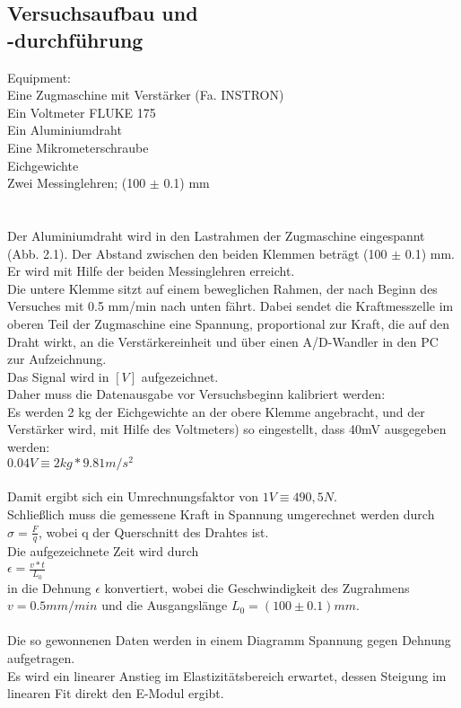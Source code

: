 \documentclass[12pt,a4paper]{article}
\begin{document}
\begin{multicols}{2}
\subsection{Versuchsaufbau und \\-durchführung}
Equipment:\\
Eine Zugmaschine mit Verstärker (Fa. INSTRON)\\
Ein Voltmeter FLUKE 175\\
Ein Aluminiumdraht\\
Eine Mikrometerschraube\\
Eichgewichte\\
Zwei Messinglehren; (100 $\pm$ 0.1) mm\\
\\
\\
Der Aluminiumdraht wird in den Lastrahmen der Zugmaschine eingespannt (Abb. 2.1). Der Abstand zwischen den beiden Klemmen beträgt (100 $\pm$ 0.1) mm. Er wird mit Hilfe der beiden Messinglehren erreicht.\\
Die untere Klemme sitzt auf einem beweglichen Rahmen, der nach Beginn des Versuches mit 0.5 mm/min nach unten fährt. Dabei sendet die Kraftmesszelle im oberen Teil der Zugmaschine eine Spannung, proportional zur Kraft, die auf den Draht wirkt, an die Verstärkereinheit und über einen A/D-Wandler in den PC zur Aufzeichnung.\\
Das Signal wird in $[V]$ aufgezeichnet.\\
Daher muss die Datenausgabe vor Versuchsbeginn kalibriert werden:\\
Es werden 2 kg der Eichgewichte an der obere Klemme angebracht, und der Verstärker wird, mit Hilfe des Voltmeters) so eingestellt, dass 40mV ausgegeben werden:\\
$0.04 V \equiv 2 kg * 9.81 m/s^2 $\\
\\
Damit ergibt sich ein Umrechnungsfaktor von $1V \equiv 490,5 N $.\\
Schließlich muss die gemessene Kraft in Spannung umgerechnet werden durch $\sigma = \frac{F}{q}$, wobei q der Querschnitt des Drahtes ist.\\
Die aufgezeichnete Zeit wird durch\\
$ \epsilon = \frac{v*t}{L_{0}} $\\
in die Dehnung $\epsilon$ konvertiert, wobei die Geschwindigkeit des Zugrahmens\\
 $v = 0.5 mm/min$ und die Ausgangslänge $ L_{0} = (100 \pm 0.1) mm $.\\
\\
Die so gewonnenen Daten werden in einem Diagramm Spannung gegen Dehnung aufgetragen.\\
Es wird ein linearer Anstieg im Elastizitätsbereich erwartet, dessen Steigung im linearen Fit direkt den E-Modul ergibt.\\


\end{multicols}
\end{document}
